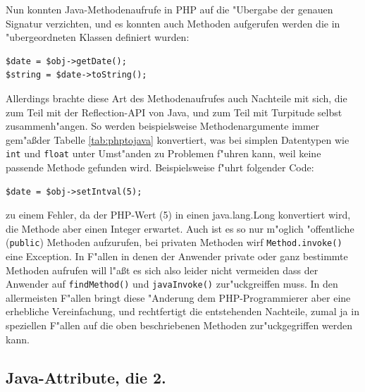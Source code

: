 Nun konnten Java-Methodenaufrufe in PHP auf die "Ubergabe der genauen Signatur verzichten, und es konnten auch Methoden aufgerufen
werden die in "ubergeordneten Klassen definiert wurden:
\begin{lstlisting}[caption=Verbesserter Aufruf einer Java-Methode]
$date = $obj->getDate();
$string = $date->toString();
\end{lstlisting}
Allerdings brachte diese Art des Methodenaufrufes auch Nachteile mit sich, die zum Teil mit der Reflection-API von Java,
und zum Teil mit Turpitude selbst zusammenh"angen. So werden beispielsweise Methodenargumente immer gem"a\ss  der Tabelle
\ref{tab:phptojava} konvertiert, was bei simplen Datentypen wie \texttt{int} und \texttt{float} unter Umst"anden zu Problemen f"uhren
kann, weil keine passende Methode gefunden wird. Beispielsweise f"uhrt folgender Code:
\begin{lstlisting}[caption=Typkonversionsfehler]
$date = $obj->setIntval(5);
\end{lstlisting}
zu einem Fehler, da der PHP-Wert (5) in einen java.lang.Long konvertiert wird, die Methode aber einen Integer erwartet.
Auch ist es so nur m"oglich "offentliche (\texttt{public}) Methoden aufzurufen,
bei privaten Methoden wirf \texttt{Method.invoke()} eine Exception.
In F"allen in denen der Anwender private oder ganz bestimmte Methoden aufrufen will l"a\ss t es sich also leider nicht vermeiden dass 
der Anwender auf \texttt{findMethod()} und \texttt{javaInvoke()} zur"uckgreiffen muss. In den allermeisten F"allen bringt diese "Anderung 
dem PHP-Programmierer aber eine erhebliche Vereinfachung, und rechtfertigt die entstehenden Nachteile, zumal ja in speziellen F"allen
auf die oben beschriebenen Methoden zur"uckgegriffen werden kann.

\subsection{Java-Attribute, die 2.}
\label{sec:chap1:impl:14}

